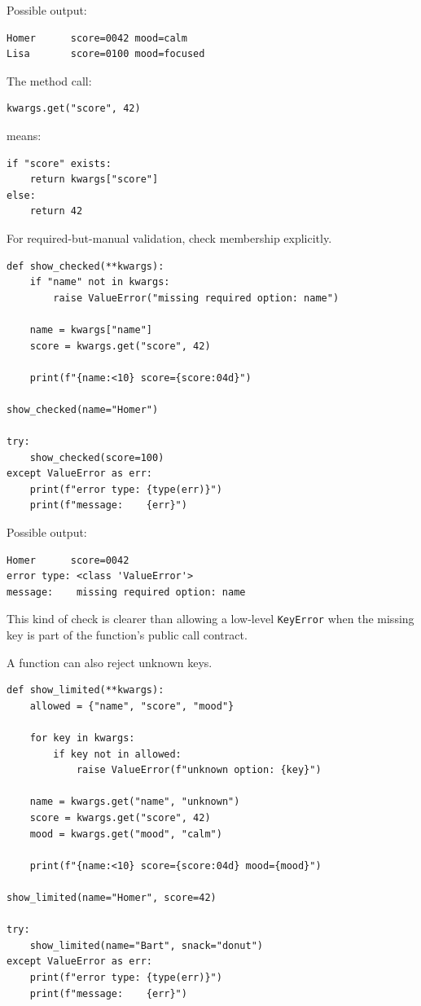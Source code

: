 Possible output:

\begin{verbatim}
Homer      score=0042 mood=calm
Lisa       score=0100 mood=focused
\end{verbatim}

The method call:

\begin{verbatim}
kwargs.get("score", 42)
\end{verbatim}

means:

\begin{verbatim}
if "score" exists:
    return kwargs["score"]
else:
    return 42
\end{verbatim}

For required-but-manual validation, check membership explicitly.

\begin{verbatim}
def show_checked(**kwargs):
    if "name" not in kwargs:
        raise ValueError("missing required option: name")

    name = kwargs["name"]
    score = kwargs.get("score", 42)

    print(f"{name:<10} score={score:04d}")

show_checked(name="Homer")

try:
    show_checked(score=100)
except ValueError as err:
    print(f"error type: {type(err)}")
    print(f"message:    {err}")
\end{verbatim}

Possible output:

\begin{verbatim}
Homer      score=0042
error type: <class 'ValueError'>
message:    missing required option: name
\end{verbatim}

This kind of check is clearer than allowing a low-level \texttt{KeyError} when the missing key is part of the function's public call contract.

A function can also reject unknown keys.

\begin{verbatim}
def show_limited(**kwargs):
    allowed = {"name", "score", "mood"}

    for key in kwargs:
        if key not in allowed:
            raise ValueError(f"unknown option: {key}")

    name = kwargs.get("name", "unknown")
    score = kwargs.get("score", 42)
    mood = kwargs.get("mood", "calm")

    print(f"{name:<10} score={score:04d} mood={mood}")

show_limited(name="Homer", score=42)

try:
    show_limited(name="Bart", snack="donut")
except ValueError as err:
    print(f"error type: {type(err)}")
    print(f"message:    {err}")
\end{verbatim}

